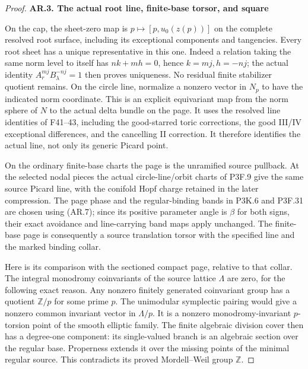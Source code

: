 \begin{proof}
\par

\medskip\noindent\textbf{AR.3. The actual root line, finite-base torsor, and square}

On the cap, the sheet-zero map is
\(p\mapsto[p,u_0(z(p))]\) on the complete resolved root
surface, including its exceptional components and tangencies.
Every root sheet has a unique representative in this one. Indeed
a relation taking the same norm level to itself has
\(nk+mh=0\), hence \(k=mj,h=-nj\); the actual identity
\(A_r^{mj}B_\lambda^{-nj}=1\) then proves uniqueness.
No residual finite stabilizer quotient remains. On the circle line,
normalize a nonzero vector in \(N_p\) to have the indicated
norm coordinate. This is an explicit equivariant map from the
norm sphere of \(N\) to the actual delta bundle on the page.
It uses the resolved line identities of F41--43, including the
good-starred toric corrections, the good III/IV exceptional
differences, and the cancelling II correction. It therefore
identifies the actual line, not only its generic Picard point.

On the ordinary finite-base charts the page is the unramified
source pullback. At the selected nodal pieces the actual
circle-line/orbit charts of P3F.9 give the same source Picard
line, with the conifold Hopf charge retained in the later
compression. The page phase and the regular-binding bands in
P3K.6 and P3F.31 are chosen using (AR.7); since its positive
parameter angle is \(\beta\) for both signs, their exact
avoidance and line-carrying band maps apply unchanged. The
finite-base page is consequently a source translation torsor
with the specified line and the marked binding collar.

Here is its comparison with the sectioned compact page, relative
to that collar. The integral monodromy coinvariants of the source
lattice \(\Lambda\) are zero, for the following exact reason.
Any nonzero finitely generated coinvariant group has a quotient
\(\mathbb Z/p\) for some prime \(p\). The unimodular
symplectic pairing would give a nonzero common invariant vector
in \(\Lambda/p\). It is a nonzero monodromy-invariant
\(p\)-torsion point of the smooth elliptic family. The finite
algebraic division cover then has a degree-one component: its
single-valued branch is an algebraic section over the regular
base. Properness extends it over the missing points of the
minimal regular source. This contradicts its proved
Mordell--Weil group \(\mathbb Z\).


\end{proof}
